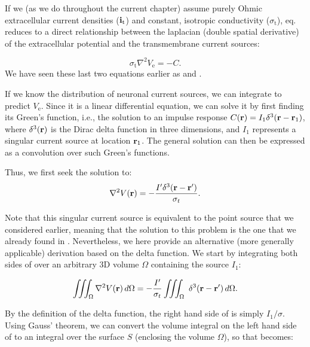 If we (as we do throughout the current chapter) assume purely Ohmic extracellular current densities (${\bf i}_\mathrm{t}$) 
and constant, isotropic conductivity ($\sigma_\mathrm{t}$), eq.  reduces to a direct relationship 
between the laplacian (double spatial derivative) of the extracellular potential and the transmembrane current sources: 

\begin{equation}
\sigma_\text{t} \nabla^2{V_\mathrm{e}} = -C.
\label{eq:VC:CSD3}
\end{equation}
We have seen these last two equations earlier as  and . 

If we know the distribution of neuronal current sources, 
we can integrate  to predict $V_\mathrm{e}$. 
Since it is a linear differential equation, we can solve it by first finding its Green's function, 
i.e., the solution to an impulse response $C({\bf r}) = I_1 \delta^3({\bf r}-{\bf r}_1)$, 
where $\delta^3({\bf r})$ is the Dirac delta function in three dimensions, 
and $I_1$ represents a singular current source at location ${\bf r}_1$. 
The general solution can then be expressed as a convolution over such Green's functions. 

Thus, we first seek the solution to:
\begin{equation}
\nabla^2 V({\bf r}) = - \frac{I' \delta^3({\bf r-r'})}{\sigma_t}.
\label{eq:VC:CSD5}
\end{equation}

Note that this singular current source is equivalent to the point source that we considered earlier, 
meaning that the solution to this problem is the one that we already found in . 
Nevertheless, we here provide an alternative (more generally applicable) derivation based on the delta function. 
We start by integrating both sides of  over an arbitrary 3D volume $\Omega$ containing the source $I_1$:

\begin{equation}
\iiint_{\Omega} \nabla^2V({\bf r}) \,d\Omega =  - \frac{I'}{\sigma_t} \iiint_\Omega \ \delta^3({\bf r-r'}) \, d\Omega.
\label{eq:VC:marit}
\end{equation}

By the definition of the delta function, the right hand side of  is simply $I_1/\sigma$. 
Using Gauss' theorem, we can convert the volume integral on the left hand side of  
to an integral over the surface $S$ (enclosing the volume $\Omega$), 
so that  becomes:

